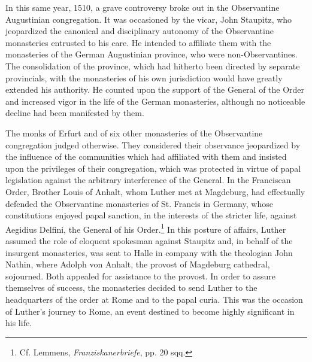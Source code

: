 In this same year, 1510, a grave controversy broke out in the
Observantine Augustinian congregation. It was occasioned by the
vicar, John Staupitz, who jeopardized the canonical and disciplinary
autonomy of the Observantine monasteries entrusted to his care. He
intended to affiliate them with the monasteries of the German Augustinian
province, who were non-Observantines. The consolidation of
the province, which had hitherto been directed by separate provincials,
with the monasteries of his own jurisdiction would have greatly
extended his authority. He counted upon the support of the General
of the Order and increased vigor in the life of the German
monasteries, although no noticeable decline had been manifested by
them.

The monks of Erfurt and of six other monasteries of the Observantine
congregation judged otherwise. They considered their observance
jeopardized by the influence of the communities which had affiliated
with them and insisted upon the privileges of their congregation,
which was protected in virtue of papal legislation against the arbitrary
interference of the General. In the Franciscan Order, Brother
Louis of Anhalt, whom Luther met at Magdeburg, had effectually
defended the Observantine monasteries of St. Francis in Germany,
whose constitutions enjoyed papal sanction, in the interests of the
stricter life, against Aegidius Delfini, the General of his Order.\footnote
{Cf. Lemmens, \textit{Franziskanerbriefe}, pp. 20 sqq.}
In this posture of affairs, Luther assumed the role of eloquent spokesman
against Staupitz and, in behalf of the insurgent monasteries,
was sent to Halle in company with the theologian John Nathin,
where Adolph von Anhalt, the provost of Magdeburg cathedral, sojourned.
Both appealed for assistance to the provost. In order to
assure themselves of success, the monasteries decided to send Luther
to the headquarters of the order at Rome and to the papal curia.
This was the occasion of Luther’s journey to Rome, an event destined
to become highly significant in his life.
